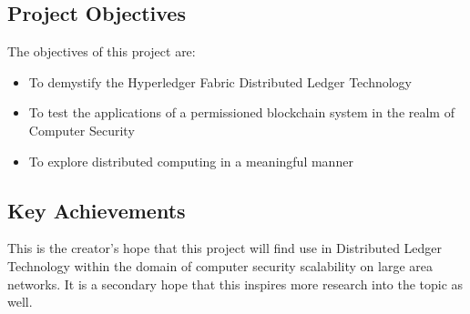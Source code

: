 	\subsection{Project Objectives}
		\hspace{10mm}The objectives of this project are:
		\begin{itemize}
			\item To demystify the Hyperledger Fabric Distributed Ledger Technology
			\item To test the applications of a permissioned blockchain system in the realm of Computer Security
			\item To explore distributed computing in a meaningful manner
		\end{itemize}
		
	\subsection{Key Achievements} 
		\hspace{10mm}This is the creator's hope that this project will find use in Distributed Ledger Technology within the domain of computer security scalability on large area networks. It is a secondary hope that this inspires more research into the topic as well.\\